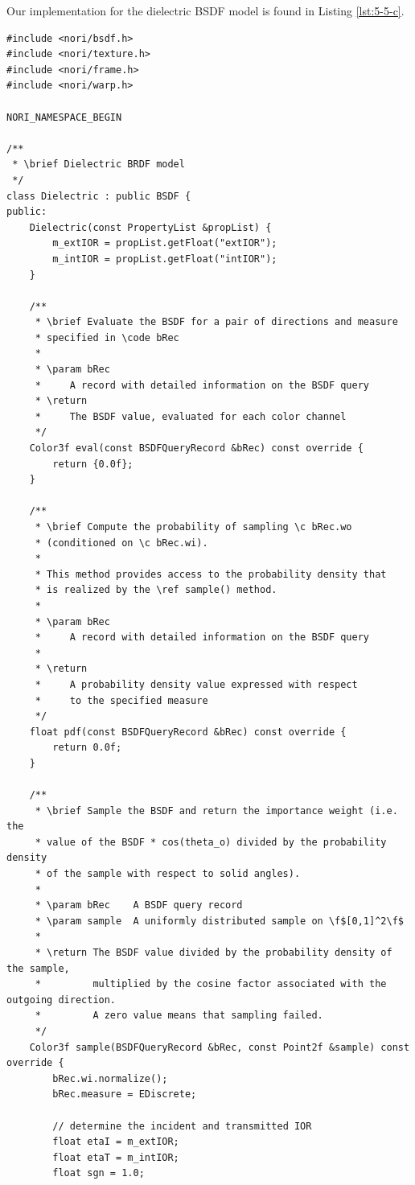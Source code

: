 \begin{enumerate}
Our implementation for the dielectric BSDF model is found in Listing \ref{lst:5-5-c}.

\begin{lstlisting}[caption={Our implementation for the dielectric BSDF model},label={lst:5-5-c}]
#include <nori/bsdf.h>
#include <nori/texture.h>
#include <nori/frame.h>
#include <nori/warp.h>

NORI_NAMESPACE_BEGIN

/**
 * \brief Dielectric BRDF model
 */
class Dielectric : public BSDF {
public:
    Dielectric(const PropertyList &propList) {
        m_extIOR = propList.getFloat("extIOR");
        m_intIOR = propList.getFloat("intIOR");
    }

    /**
     * \brief Evaluate the BSDF for a pair of directions and measure
     * specified in \code bRec
     *
     * \param bRec
     *     A record with detailed information on the BSDF query
     * \return
     *     The BSDF value, evaluated for each color channel
     */
    Color3f eval(const BSDFQueryRecord &bRec) const override {
        return {0.0f};
    }

    /**
     * \brief Compute the probability of sampling \c bRec.wo
     * (conditioned on \c bRec.wi).
     *
     * This method provides access to the probability density that
     * is realized by the \ref sample() method.
     *
     * \param bRec
     *     A record with detailed information on the BSDF query
     *
     * \return
     *     A probability density value expressed with respect
     *     to the specified measure
     */
    float pdf(const BSDFQueryRecord &bRec) const override {
        return 0.0f;
    }

    /**
     * \brief Sample the BSDF and return the importance weight (i.e. the
     * value of the BSDF * cos(theta_o) divided by the probability density
     * of the sample with respect to solid angles).
     *
     * \param bRec    A BSDF query record
     * \param sample  A uniformly distributed sample on \f$[0,1]^2\f$
     *
     * \return The BSDF value divided by the probability density of the sample,
     *         multiplied by the cosine factor associated with the outgoing direction.
     *         A zero value means that sampling failed.
     */
    Color3f sample(BSDFQueryRecord &bRec, const Point2f &sample) const override {
        bRec.wi.normalize();
        bRec.measure = EDiscrete;

        // determine the incident and transmitted IOR
        float etaI = m_extIOR;
        float etaT = m_intIOR;
        float sgn = 1.0;


\end{lstlisting}
\end{enumerate}
